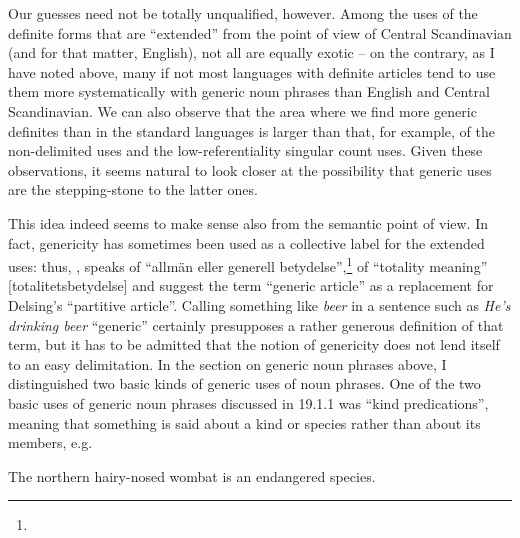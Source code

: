 \begin{styleBodytextC}
Our guesses need not be totally unqualified, however. Among the uses of the definite forms that are “extended” from the point of view of Central Scandinavian (and for that matter, English), not all are equally exotic – on the contrary, as I have noted above, many if not most languages with definite articles tend to use them more systematically with generic noun phrases than English and Central Scandinavian. We can also observe that the area where we find more generic definites than in the standard languages is larger than that, for example, of the non-delimited uses and the low-referentiality singular count uses. Given these observations, it seems natural to look closer at the possibility that generic uses are the stepping-stone to the latter ones. 

\end{styleBodytextC}

\begin{styleBodytextC}
This idea indeed seems to make sense also from the semantic point of view. In fact, genericity has sometimes been used as a collective label for the extended uses: thus, \citet[134]{Hummelstedt1934}, speaks of “allmän eller generell betydelse”,\footnote{} \citet[29]{Marklund1976} of “totality meaning” [totalitetsbetydelse] and \citet{BergholmEtAl1999} suggest the term “generic article” as a replacement for Delsing’s “partitive article”. Calling something like \textit{beer} in a sentence such as \textit{He’s drinking beer} “generic” certainly presupposes a rather generous definition of that term, but it has to be admitted that the notion of genericity does not lend itself to an easy delimitation. In the section on generic noun phrases above, I distinguished two basic kinds of generic uses of noun phrases. One of the two basic uses of generic noun phrases discussed in 19.1.1 was “kind predications”, meaning that something is said about a kind or species rather than about its members, e.g. 

\end{styleBodytextC}

\begin{listWWNumileveli}
\item 

\begin{styleExample}
The northern hairy-nosed wombat is an endangered species. 

\end{styleExample}

\end{listWWNumileveli}

